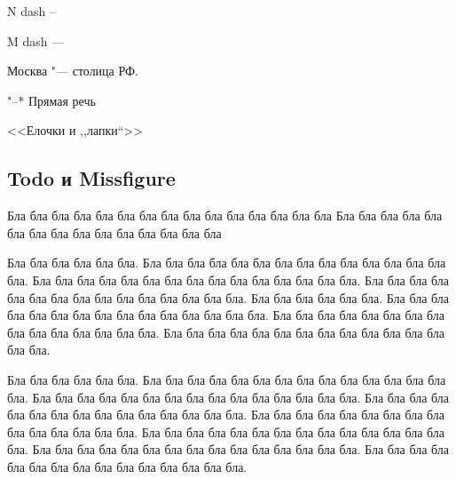 \documentclass[12pt, a4paper]{article}
\begin{document}
N dash --

M dash ---

Москва "--- столица РФ.

"--* Прямая речь

<<Елочки и ,,лапки``>>


\subsection{Todo и Missfigure}



Бла бла бла бла бла бла бла бла бла бла бла бла бла бла бла   Бла бла бла бла бла бла бла бла бла бла бла бла бла бла бла

 Бла бла бла бла бла бла. Бла бла бла бла бла бла бла бла бла бла бла бла бла бла бла. Бла бла бла бла бла бла бла бла бла бла бла бла бла бла бла. Бла бла бла бла бла бла бла бла бла бла бла бла бла бла бла. Бла бла бла бла бла бла. Бла бла бла бла бла бла бла бла бла бла бла бла бла бла бла. Бла бла бла бла бла бла бла бла бла бла бла бла бла бла бла. Бла бла бла бла бла бла бла бла бла бла бла бла бла бла бла.
  
   Бла бла бла бла бла бла. Бла бла бла бла бла бла бла бла бла бла бла бла бла бла бла. Бла бла бла бла бла бла бла бла бла бла бла бла бла бла бла. Бла бла бла бла бла бла бла бла бла бла бла бла бла бла бла. Бла бла бла бла бла бла бла бла бла  бла бла бла бла бла бла. Бла бла бла бла бла бла бла бла бла бла бла бла бла бла бла. Бла бла бла бла бла бла бла бла бла бла бла бла бла бла бла. Бла бла бла бла бла бла бла бла бла бла бла бла бла бла бла.

\vspace{2mm}


\vspace{2mm}


\end{document}
